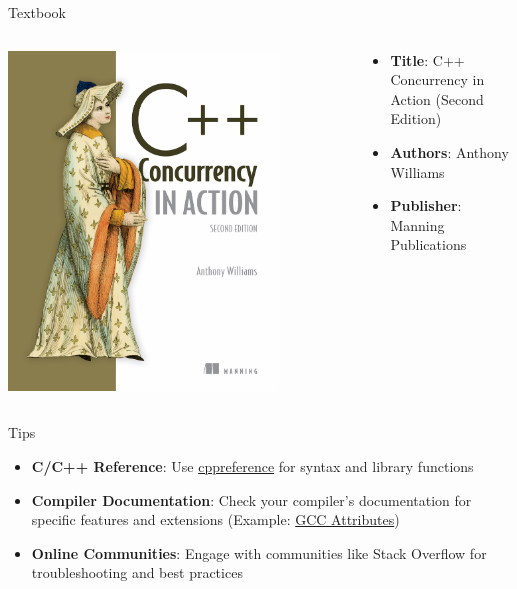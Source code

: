 \begin{frame}[fragile]{ Textbook}

	\begin{columns}
		\begin{column}{0.4\textwidth}
			\begin{center}
				\includegraphics[width=0.8\textwidth]{day8_pm/img/1-ccia}
			\end{center}

		\end{column}
		\begin{column}{0.6\textwidth}
			\begin{itemize}
				\item \textbf{Title}: C++ Concurrency in Action (Second Edition)
				\item \textbf{Authors}: Anthony Williams
				\item \textbf{Publisher}: Manning Publications
			\end{itemize}
		\end{column}
	\end{columns}
\end{frame}

\begin{frame}[fragile]{ Tips}
	\begin{itemize}
		\item \textbf{C/C++ Reference}: Use \textcolor{blue}{\href{https://en.cppreference.com/}{cppreference}} for syntax and library functions
		\item \textbf{Compiler Documentation}: Check your compiler's documentation for specific features and extensions (Example: \textcolor{blue}{\href{https://gcc.gnu.org/onlinedocs/gcc/Attributes.html}{GCC Attributes}})
		\item \textbf{Online Communities}: Engage with communities like Stack Overflow for troubleshooting and best practices
	\end{itemize}
\end{frame}

